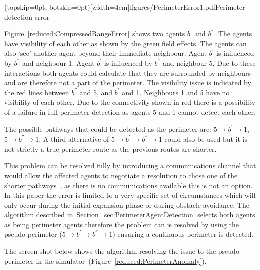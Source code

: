 \documentclass{ieeeaccess}
\begin{document}
\Figure[t!](topskip=0pt, botskip=0pt)[width=4cm]{figures/PerimeterError1.pdf}{Perimeter detection error\label{reduced:CompressedRangeError}}

Figure~\ref{reduced:CompressedRangeError} shows two agents $b^{'}$ and $b^{''}$. The agents have visibility of each other as shown by the green field effects. The agents can also `see' another agent beyond their immediate neighbour. Agent $b^{'}$ is influenced by $b^{''}$ and neighbour 1. Agent $b^{'}$ is influenced by $b^{''}$ and neighbour 5. Due to these interactions both agents could calculate that they are surrounded by neighbours and are therefore not a part of the perimeter. The visibility issue is indicated by the red lines between $b^{''}$ and 5, and $b^{'}$ and 1. Neighbours 1 and 5 have no visibility of each other. Due to the connectivity shown in red there is a possibility of a failure in full perimeter detection as agents 5 and 1 cannot detect each other. 

The possible pathways that could be detected as the perimeter are: $5 \rightarrow b^{'} \rightarrow 1$, $5 \rightarrow b^{''} \rightarrow 1$. A third alternative of $5 \rightarrow b^{'} \rightarrow b^{''} \rightarrow 1$ could also be used but it is not strictly a true perimeter route as the previous routes are shorter.  

This problem can be resolved fully by introducing a communications channel that would allow the affected agents to negotiate a resolution to chose one of the shorter pathways~\cite{MD:09}, as there is no communications available this is not an option. In this paper the error is limited to a very specific set of circumstances which will only occur during the initial expansion phase or during obstacle avoidance. The algorithm described in~Section~\ref{sec:PerimeterAgentDetection} selects both agents as being perimeter agents therefore the problem can is resolved by using the pseudo-perimeter ($5 \rightarrow b^{'} \rightarrow b^{''} \rightarrow 1$) ensuring a continuous perimeter is detected. 

The screen shot below shows the algorithm resolving the issue to the pseudo-perimeter in the simulator~(Figure~\ref{reduced:PerimeterAnomaly}).

\end{document}
